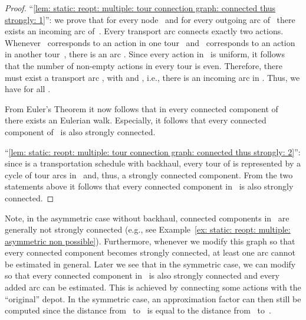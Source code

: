 \documentclass[english]{llncs}
\numberwithin{sublemma}{lemma}
\begin{document}
\begin{proof}
``\ref{lem: static: reopt: multiple: tour connection graph: connected thus strongly: 1}'': 
we prove that for every node~ and for every outgoing arc  of~ there exists an incoming arc  of~.
Every transport arc  connects exactly two actions.
Whenever~ corresponds to an action in one tour~ and~ corresponds to an action in another tour~, there is an arc .
Since every action in~ is uniform, it follows that the number of non-empty actions in every tour is even.
Therefore, there must exist a transport arc , with  and , i.e., there is an incoming arc in .
Thus, we have  for all .


From Euler's Theorem it now follows that in every connected component of~ there exists an Eulerian walk.
Especially, it follows that every connected component of~ is also strongly connected.


``\ref{lem: static: reopt: multiple: tour connection graph: connected thus strongly: 2}'': 
since  is a transportation schedule with backhaul, every tour of  is represented by a cycle of tour arcs in~ and, thus, a strongly connected component.
From the two statements above it follows that every connected component in~ is also strongly connected.
\end{proof}



Note, in the asymmetric case without backhaul, connected components in~ are generally not strongly connected (e.g., see Example~\ref{ex: static: reopt: multiple: asymmetric non possible}).
Furthermore, whenever we modify this graph so that every connected component becomes strongly connected, at least one arc cannot be estimated in general.
Later we see that in the symmetric case, we can modify~ so that every connected component in~ is also strongly connected and every added arc can be estimated.
This is achieved by connecting some actions with the ``original'' depot.
In the symmetric case, an approximation factor can then still be computed since the distance from~ to~ is equal to the distance from~ to~.
\end{document}
